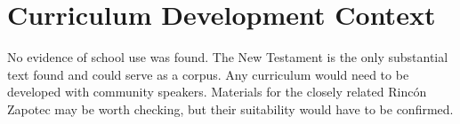 \documentclass[12pt]{article}
\begin{document}
\section{Curriculum Development Context}
No evidence of school use was found. The New Testament is the only substantial text found and could serve as a corpus. Any curriculum would need to be developed with community speakers. Materials for the closely related Rinc\'on Zapotec may be worth checking, but their suitability would have to be confirmed.
\end{document}
